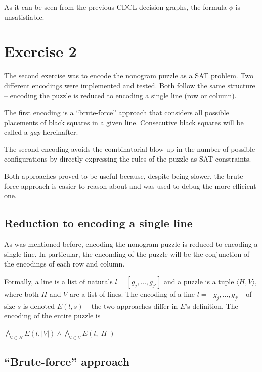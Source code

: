 \documentclass[12pt]{article}
\begin{document}
\vspace{1cm}

As it can be seen from the previous CDCL decision graphs, the formula $\phi$ is unsatisfiable.

\section*{Exercise 2}

The second exercise was to encode the nonogram puzzle as a SAT problem.
Two different encodings were implemented and tested.
Both follow the same structure -- encoding the puzzle is reduced to encoding a single line (row or column).

The first encoding is a ``brute-force'' approach that considers all possible placements of black squares in a given line.
Consecutive black squares will be called a \textit{gap} hereinafter.

The second encoding avoids the combinatorial blow-up in the number of possible configurations by directly expressing the rules of the puzzle as SAT constraints.

Both approaches proved to be useful because, despite being slower, the brute-force approach is easier to reason about and was used to debug the more efficient one.

\subsection*{Reduction to encoding a single line}

As was mentioned before, encoding the nonogram puzzle is reduced to encoding a single line.
In particular, the enconding of the puzzle will be the conjunction of the encodings of each row and column.

Formally, a line is a list of naturals $l = [g_j, \ldots, g_{j'}]$ and a puzzle is a tuple $\langle H, V\rangle$, where both $H$ and $V$ are a list of lines.
The encoding of a line $l = [g_j, \ldots, g_{j'}]$ of size $s$ is denoted $E(l, s)$ -- the two approaches differ in $E$'s definition.
The encoding of the entire puzzle is

\begin{center}
  $\bigwedge\limits_{l \in H} E(l, |V|) \wedge \bigwedge\limits_{l \in V} E(l, |H|)$
\end{center}


\subsection*{``Brute-force'' approach}
\end{document}
